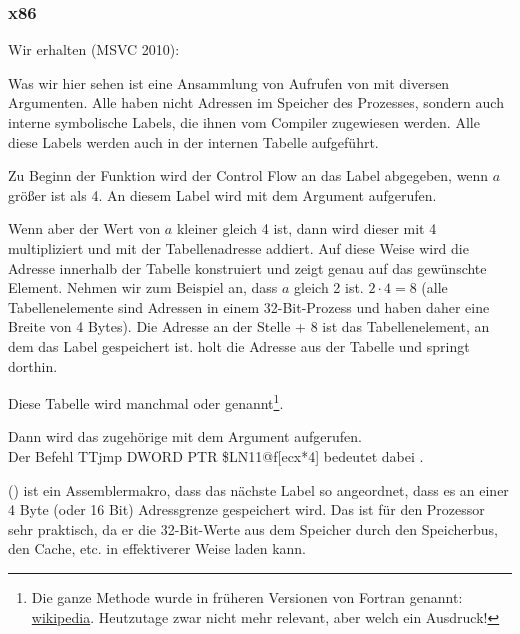\subsubsection{x86}


Wir erhalten (MSVC 2010):



Was wir hier sehen ist eine Ansammlung von Aufrufen von \printf mit diversen Argumenten.
Alle haben nicht Adressen im Speicher des Prozesses, sondern auch interne symbolische Labels, die ihnen vom Compiler
zugewiesen werden.
Alle diese Labels werden auch in der internen Tabelle  aufgeführt. 

Zu Beginn der Funktion wird der Control Flow an das Label  abgegeben, wenn $a$ größer ist als 4. An diesem
Label wird \printf mit dem Argument  aufgerufen.

Wenn aber der Wert von $a$ kleiner gleich 4 ist, dann wird dieser mit 4 multipliziert und mit der Tabellenadresse
 addiert. Auf diese Weise wird die Adresse innerhalb der Tabelle konstruiert und zeigt genau auf das
gewünschte Element. Nehmen wir zum Beispiel an, dass $a$ gleich 2 ist. $2\cdot 4=8$ (alle Tabellenelemente sind
Adressen in einem 32-Bit-Prozess und haben daher eine Breite von 4 Bytes).
Die Adresse an der Stelle  + 8 ist das Tabellenelement, an dem das Label  gespeichert ist.
\JMP holt die Adresse  aus der Tabelle und springt dorthin.

Diese Tabelle wird manchmal  oder  genannt\footnote{Die ganze Methode wurde
in früheren Versionen von Fortran  genannt:
\href{http://go.yurichev.com/17122}{wikipedia}.
Heutzutage zwar nicht mehr relevant, aber welch ein Ausdruck!}.

Dann wird das zugehörige \printf mit dem Argument  aufgerufen.\\
Der Befehl TT{jmp DWORD PTR \$LN11@f[ecx*4]} bedeutet dabei .

 () ist ein Assemblermakro, dass das nächste Label so angeordnet, dass es an einer 4 Byte
(oder 16 Bit) Adressgrenze gespeichert wird. Das ist für den Prozessor sehr praktisch, da er die 32-Bit-Werte aus dem
Speicher durch den Speicherbus, den Cache, etc. in effektiverer Weise laden kann.

